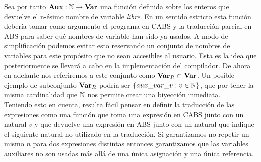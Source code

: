 Sea por tanto $\textbf{Aux}: \mathbb{N} \rightarrow \textbf{Var}$ una función definida sobre los enteros que devuelve el n-ésimo nombre de variable {\it libre}. En un sentido estricto esta función debería tomar como argumento el programa en CABS y la traducción parcial en ABS para saber qué nombres de variable han sido ya usados. A modo de simplificación podemos evitar esto reservando un conjunto de nombres de variables para este propósito que no sean accesibles al usuario. Esta es la idea que posteriormente se llevará a cabo en la implementación del compilador. De ahora en adelante nos referiremos a este conjunto como $\textbf{Var}_R \subset \textbf{Var}$. Un posible ejemplo de subconjunto $\textbf{Var}_R$ podría ser $\{aux\_var\_v: v \in \mathbb{N}\}$, que por tener la misma cardinalidad que $\mathbb{N}$ nos permite crear una biyección inmediata.\\

Teniendo esto en cuenta, resulta fácil pensar en definir la traducción de las expresiones como una función que toma una expresión en CABS junto con un natural $v$ y que devuelve una expresión en ABS junto con un natural que indique el siguiente natural no utilizado en la traducción. Si garantizamos no repetir un mismo $n$ para dos expresiones distintas entonces garantizamos que las variables auxiliares no son usadas más allá de una única asignación y una única referencia.\\

